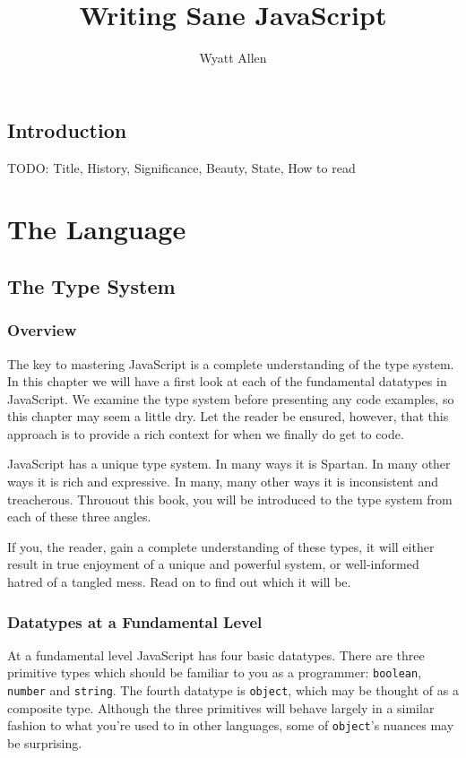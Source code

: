 \documentclass[11pt,letter]{book}
\begin{document}
    \title{Writing Sane JavaScript}
    \author{Wyatt Allen}
    \maketitle
    
    \chapter{Introduction}
    TODO: Title, History, Significance, Beauty, State, How to read
    
    \part{The Language}
    \chapter{The Type System}
    \section{Overview}
    The key to mastering JavaScript is a complete understanding of the type system. In this chapter
    we will have a first look at each of the fundamental datatypes in JavaScript. We examine the 
    type system before presenting any code examples, so this chapter may seem a little dry. Let the 
    reader be ensured, however, that this approach is to provide a rich context for when we finally
    do get to code.
    
    JavaScript has a unique type system. In many ways it is Spartan. In many other ways 
    it is rich and expressive. In many, many other ways it is inconsistent and treacherous.
    Throuout this book, you will be introduced to the type system from each of these three 
    angles.
    
    If you, the reader, gain a complete understanding of these types, it will either result 
    in true enjoyment of a unique and powerful system, or well-informed hatred of a tangled 
    mess. Read on to find out which it will be.
    
    \section{Datatypes at a Fundamental Level}
    At a fundamental level JavaScript has four basic datatypes. There are three primitive 
    types which should be familiar to you as a programmer: \texttt{boolean}, \texttt{number} 
    and \texttt{string}. The fourth datatype is \texttt{object}, which may be thought of as a 
    composite type. Although the three primitives will behave largely in a similar 
    fashion to what you're used to in other languages, some of \texttt{object}'s nuances 
    may be surprising.
    
\end{document}
